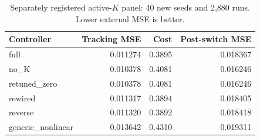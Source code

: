 \begin{table}[H]\centering\small
\caption{Separately registered active-$K$ panel: 40 new seeds and 2,880 runs. Lower external MSE is better.}
\label{tab:study3-active}
\begin{tabular}{lrrr}\toprule
Controller & Tracking MSE & Cost & Post-switch MSE \\ \midrule
full & 0.011274 & 0.3895 & 0.018367 \\
no\_K & 0.010378 & 0.4081 & 0.016246 \\
retuned\_zero & 0.010378 & 0.4081 & 0.016246 \\
rewired & 0.011317 & 0.3894 & 0.018405 \\
reverse & 0.011320 & 0.3892 & 0.018418 \\
generic\_nonlinear & 0.013642 & 0.4310 & 0.019311 \\
\bottomrule\end{tabular}\end{table}
